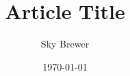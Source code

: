 \documentclass[11pt,a4paper]{amsart}
\title{Article Title}
\author{Sky Brewer}
\date{\today}
\theoremstyle{definition}
\theoremstyle{remark}
\numberwithin{equation}{section}
\begin{document}
\begin{abstract}
  \noindent
\end{abstract}

\maketitle




\end{document}
